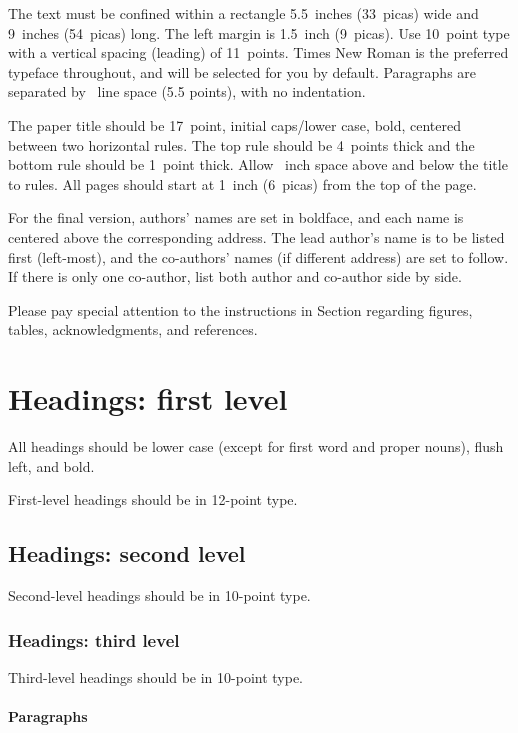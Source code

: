\documentclass{article}
\begin{document}
The text must be confined within a rectangle 5.5~inches (33~picas) wide and
9~inches (54~picas) long. The left margin is 1.5~inch (9~picas).  Use 10~point
type with a vertical spacing (leading) of 11~points.  Times New Roman is the
preferred typeface throughout, and will be selected for you by default.
Paragraphs are separated by ~line space (5.5 points), with no
indentation.


The paper title should be 17~point, initial caps/lower case, bold, centered
between two horizontal rules. The top rule should be 4~points thick and the
bottom rule should be 1~point thick. Allow ~inch space above and
below the title to rules. All pages should start at 1~inch (6~picas) from the
top of the page.


For the final version, authors' names are set in boldface, and each name is
centered above the corresponding address. The lead author's name is to be listed
first (left-most), and the co-authors' names (if different address) are set to
follow. If there is only one co-author, list both author and co-author side by
side.


Please pay special attention to the instructions in Section 
regarding figures, tables, acknowledgments, and references.


\section{Headings: first level}
\label{headings}


All headings should be lower case (except for first word and proper nouns),
flush left, and bold.


First-level headings should be in 12-point type.


\subsection{Headings: second level}


Second-level headings should be in 10-point type.


\subsubsection{Headings: third level}


Third-level headings should be in 10-point type.


\paragraph{Paragraphs}
\end{document}
